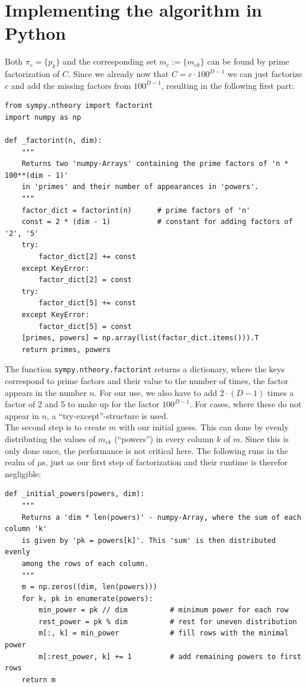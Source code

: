 \documentclass[english, parskip=full]{scrartcl}
\begin{document}
\section{Implementing the algorithm in Python}
Both $\pi_c=\{p_k\}$ and the corresponding set $m_c:=\{m_{ck}\}$ can be found by prime factorization of $C$. Since we already now that $C=c\cdot 100^{D-1}$ we can just factorize $c$ and add the missing factors from $100^{D-1}$, resulting in the following first part:
\begin{verbatim}
from sympy.ntheory import factorint
import numpy as np

def _factorint(n, dim):
    """
    Returns two 'numpy-Arrays' containing the prime factors of 'n * 100**(dim - 1)'
    in 'primes' and their number of appearances in 'powers'.
    """
    factor_dict = factorint(n)      # prime factors of 'n'
    const = 2 * (dim - 1)           # constant for adding factors of '2', '5'
    try:
        factor_dict[2] += const
    except KeyError:
        factor_dict[2] = const
    try:
        factor_dict[5] += const
    except KeyError:
        factor_dict[5] = const
    [primes, powers] = np.array(list(factor_dict.items())).T
    return primes, powers
\end{verbatim}
The function \texttt{sympy.ntheory.factorint} returns a dictionary, where the keys correspond to prime factors and their value to the number of times, the factor appears in the number $n$. For our use, we also have to add $2 \cdot (D - 1)$ times a factor of 2 and 5 to make up for the factor $100^{D-1}$. For cases, where these do not appear in $n$, a ``try-except''-structure is used.\\
The second step is to create $m$ with our initial guess. This can done by evenly distributing the values of $m_{ck}$ (``powers'') in every column $k$ of $m$. Since this is only done once, the performance is not critical here. The following runs in the realm of $\mu$s, just as our first step of factorization and their runtime is therefor negligible:
\begin{verbatim}
def _initial_powers(powers, dim):
    """
    Returns a 'dim * len(powers)' - numpy-Array, where the sum of each column 'k' 
    is given by 'pk = powers[k]'. This 'sum' is then distributed evenly 
    among the rows of each column.
    """
    m = np.zeros((dim, len(powers)))
    for k, pk in enumerate(powers):
        min_power = pk // dim          # minimum power for each row
        rest_power = pk % dim          # rest for uneven distribution
        m[:, k] = min_power            # fill rows with the minimal power
        m[:rest_power, k] += 1         # add remaining powers to first rows
    return m
\end{verbatim}
\end{document}
